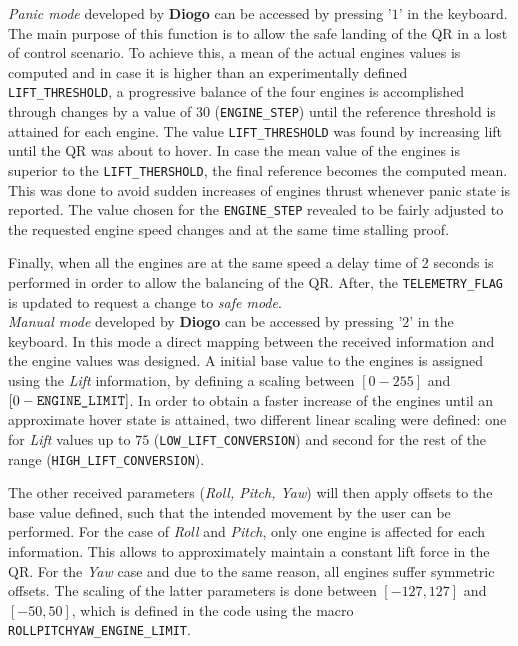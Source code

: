 \documentclass{article}
\begin{document}
\textit{Panic mode} developed by \textbf{Diogo} can be accessed by pressing '$1$' in the keyboard. The main purpose of this function is to allow the safe landing of the QR in a lost of control scenario. To achieve this, a mean of the actual engines values is computed and in case it is higher than an experimentally defined \texttt{LIFT\_THRESHOLD}, a progressive balance of the four engines is accomplished through changes by a value of $30$ (\texttt{ENGINE\_STEP}) until the reference threshold is attained for each engine. The value \texttt{LIFT\_THRESHOLD} was found by increasing lift until the QR was about to hover.  In case the mean value of the engines is superior to the \texttt{LIFT\_THERSHOLD}, the final reference becomes the computed mean. This was done to avoid sudden increases of engines thrust whenever panic state is reported. The value chosen for the \texttt{ENGINE\_STEP} revealed to be fairly adjusted to the requested engine speed changes and at the same time stalling proof.

Finally, when all the engines are at the same speed a delay time of 2 seconds is performed in order to allow the balancing of the QR. After, the \texttt{TELEMETRY\_FLAG} is updated to request a change to \textit{safe mode}.\\

\textit{Manual mode} developed by \textbf{Diogo} can be accessed by pressing '$2$' in the keyboard. In this mode a direct mapping between the received information and the engine values was designed. A initial base value to the engines is assigned using the \textit{Lift} information, by defining a scaling between $[0-255]$ and $[0-\text{\texttt{ENGINE\_LIMIT}}]$. In order to obtain a faster increase of the engines until an approximate hover state is attained, two different linear scaling were defined: one for \textit{Lift} values up to $75$ (\texttt{LOW\_LIFT\_CONVERSION}) and second for the rest of the range (\texttt{HIGH\_LIFT\_CONVERSION}).

The other received parameters (\textit{Roll, Pitch, Yaw}) will then apply offsets to the base value defined, such that the intended movement by the user can be performed. For the case of \textit{Roll} and \textit{Pitch}, only one engine is affected for each information. This allows to approximately maintain a constant lift force in the QR. For the \textit{Yaw} case and due to the same reason, all engines suffer symmetric offsets. The scaling of the latter parameters is done between $[-127,127]$ and $[-50,50]$, which is defined in the code using the macro \texttt{ROLLPITCHYAW\_ENGINE\_LIMIT}. 
\end{document}
